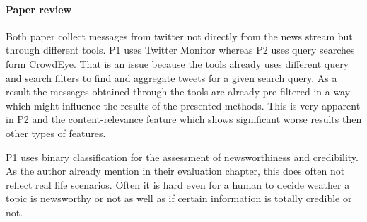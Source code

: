 \documentclass{proseminar}
\begin{document}

\paragraph{Paper review}
Both paper collect messages from twitter not directly from the news stream but through different tools. P1 uses Twitter Monitor whereas P2 uses query searches form CrowdEye.
That is an issue because the tools already uses different query and search filters to find and aggregate tweets for a given search query. As a result the messages obtained through the tools are already pre-filtered in a way which might influence the results of the presented methods.
This is very apparent in P2 and the content-relevance feature which shows significant worse results then other types of features. 

P1 uses binary classification for the assessment of newsworthiness and credibility. As the author already mention in their evaluation chapter, this does often not reflect real life scenarios. Often it is hard even for a human to decide weather a topic is newsworthy or not as well as if certain information is totally credible or not.























 

\balancecolumns
\end{document}
